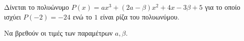 Δίνεται το πολυώνυμο $ P(x)=ax^3+(2a-\beta)x^2+4x-3\beta+5 $ για το οποίο ισχύει $ P(-2)=-24 $ ενώ το $ 1 $ είναι ρίζα του πολυωνύμου.
\begin{alist}
\item Να βρεθούν οι τιμές των παραμέτρων $ a,\beta $.
\item 
\end{alist}
